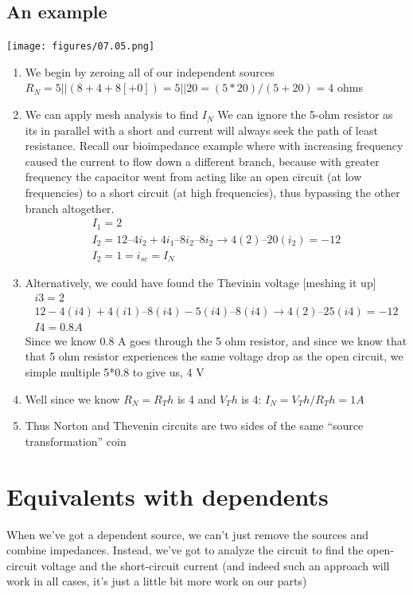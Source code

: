 \documentclass[11pt]{book}
\begin{document}
\subsection{An example}
\texttt{[image: figures/07.05.png]}
\begin{enumerate}
	\item We begin by zeroing all of our independent sources 
	\subitem $R_N = 5 || (8 +4 +8 [+0]) = 5||20 = (5*20)/(5+20) = 4$ ohms
	\item We can apply mesh analysis to find $I_N$
	\subitem We can ignore the 5-ohm resistor as its in parallel with a short and current will always seek the path of least resistance.
	\subsubitem Recall our bioimpedance example where with increasing frequency caused the current to flow down a different branch, because with greater frequency the capacitor went from acting like an open circuit (at low frequencies) to a short circuit (at high frequencies), thus bypassing the other branch altogether.
	\begin{eqnarray}
		I_1 = 2  \\
		I_2 = 12 – 4i_2 +4i_1 – 8i_2 – 8 i_2 \rightarrow 4(2) – 20(i_2) = -12 \\ 
		I_2 = 1 = i_{sc} = I_N
	\end{eqnarray}
	\item Alternatively, we could have found the Thevinin voltage [meshing it up]
	\begin{eqnarray}
		i3 = 2 \\
		12 -4(i4) + 4(i1) – 8(i4) -5(i4) – 8(i4) \rightarrow 4(2) – 25(i4) = -12 \\
		I4 = 0.8 A
	\end{eqnarray}
	\subitem Since we know 0.8 A goes through the 5 ohm resistor, and since we know that that 5 ohm resistor experiences the same voltage drop as the open circuit, we simple multiple 5*0.8 to give us, 4 V
	\item Well since we know $R_N = R_Th$ is 4 and $V_Th$ is 4: $I_N = V_Th/R_Th = 1 A$
	\item Thus Norton and Thevenin circuits are two sides of the same “source transformation” coin
\end{enumerate}

\newpage

\section{Equivalents with dependents}
When we’ve got a dependent source, we can’t just remove the sources and combine impedances. Instead, we’ve got to analyze the circuit to find the open-circuit voltage and the short-circuit current (and indeed such an approach will work in all cases, it’s just a little bit more work on our parts)
\end{document}
